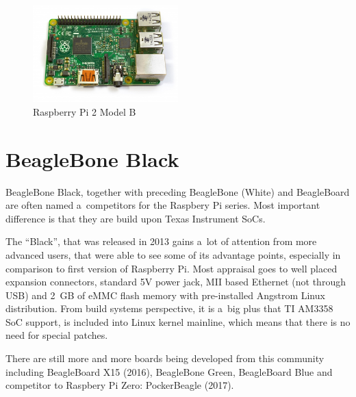 \documentclass[printmode]{mgr}
\begin{document}
\begin{figure}[htbp]
  \centering
    \includegraphics[width=0.5\textwidth]{raspberrypi2-front.jpg}
  \caption{Raspberry Pi 2 Model B}
  \label{fig:devboard-raspberrypi2}
\end{figure}






\section{BeagleBone Black}

BeagleBone Black, together with preceding BeagleBone (White) and BeagleBoard are often named a~competitors for the Raspbery Pi series.
Most important difference is that they are build upon Texas Instrument SoCs.

The ``Black'', that was released in 2013 gains a~lot of attention from more advanced users, that were able to see some of its advantage points, especially in comparison to first version of Raspberry Pi.
Most appraisal goes to well placed expansion connectors, standard 5V power jack, MII based Ethernet (not through USB) and 2~GB of eMMC flash memory with pre-installed Angstrom Linux distribution.
From build systems perspective, it is a~big plus that TI AM3358 SoC support, is included into Linux kernel mainline, which means that there is no need for special patches.

There are still more and more boards being developed from this community including BeagleBoard X15 (2016), BeagleBone Green, BeagleBoard Blue and competitor to Raspbery Pi Zero: PockerBeagle (2017).
\end{document}
